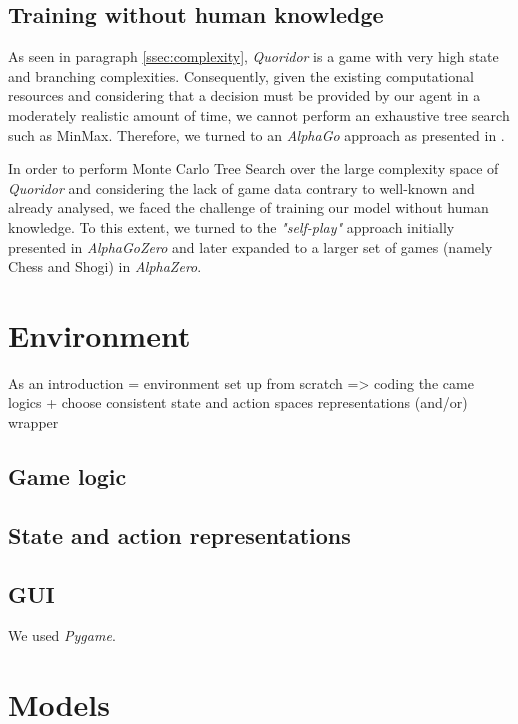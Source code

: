 \documentclass[journal, a4paper]{IEEEtran}
\begin{document}
\subsection{Training without human knowledge}
\label{ssec:human-knowledge}

As seen in paragraph \ref{ssec:complexity}, \textit{Quoridor} is a game with very high state and branching complexities. Consequently, given the existing computational resources and considering that a decision must be provided by our agent in a moderately realistic amount of time, we cannot perform an exhaustive tree search such as MinMax. Therefore, we turned to an \textit{AlphaGo} approach as presented in \cite{alphago}.

In order to perform Monte Carlo Tree Search over the large complexity space of \textit{Quoridor} and considering the lack of game data contrary to well-known and already analysed, we faced the challenge of training our model without human knowledge. To this extent, we turned to the \textit{"self-play"} approach initially presented in  \textit{AlphaGoZero}\cite{alphagozero} and later expanded to a larger set of games (namely Chess and Shogi) in \textit{AlphaZero}\cite{alphazero}.

\section{Environment}
\label{sec:environment}

As an introduction = environment set up from scratch => coding the came logics + choose consistent state and action spaces representations (and/or) wrapper

\subsection{Game logic}

\subsection{State and action representations}

\subsection{GUI}
We used \textit{Pygame}.


\section{Models}
\label{sec:models}
\end{document}
